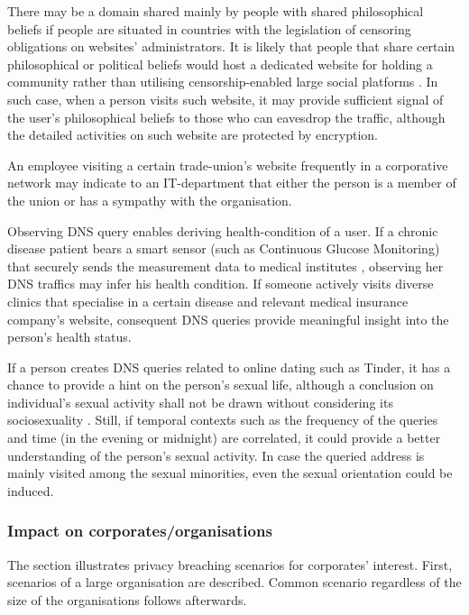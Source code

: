 There may be a domain shared mainly by people with shared philosophical beliefs if people are situated in countries with the legislation of censoring obligations on websites' administrators.
It is likely that people that share certain philosophical or political beliefs would host a dedicated website for holding a community rather than utilising censorship-enabled large social platforms \cite{mackinnon2009china}.
In such case, when a person visits such website, it may provide sufficient signal of the user's philosophical beliefs to those who can eavesdrop the traffic, although the detailed activities on such website are protected by encryption.

An employee visiting a certain trade-union's website frequently in a corporative network may indicate to an IT-department that either the person is a member of the union or has a sympathy with the organisation. 

Observing DNS query enables deriving health-condition of a user. If a chronic disease patient bears a smart sensor (such as Continuous Glucose Monitoring) that securely sends the measurement data to medical institutes \cite{carelink-uploading, medtronic-watson}, observing her DNS traffics may infer his health condition.
If someone actively visits diverse clinics that specialise in a certain disease and relevant medical insurance company's website, consequent DNS queries provide meaningful insight into the person's health status.

If a person creates DNS queries related to online dating such as Tinder, it has a chance to provide a hint on the person's sexual life, although a conclusion on individual's sexual activity shall not be drawn without considering its sociosexuality \cite{sevi2018exploring}. Still, if temporal contexts such as the frequency of the queries and time (in the evening or midnight) are correlated, it could provide a better understanding of the person's sexual activity.
In case the queried address is mainly visited among the sexual minorities, even the sexual orientation could be induced.

\subsubsection{Impact on corporates/organisations}
The section illustrates privacy breaching scenarios for corporates' interest. First, scenarios of a large organisation are described. Common scenario regardless of the size of the organisations follows afterwards.

